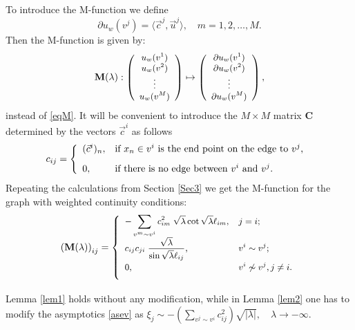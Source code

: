 \documentclass{amsart}
\theoremstyle{definition}
\theoremstyle{remark}
\numberwithin{equation}{section}
\begin{document}
{To introduce the M-function we define
\begin{equation}
\partial u_w (v^j) = \langle \vec{c}^j, \vec{u}^j \rangle, \quad m = 1,2, \dots, M.
\end{equation}
Then the M-function is given by:
\begin{equation}  \label{eqMw}
\small \mathbf M (\lambda):
\left(
\begin{array}{c}
u_w (v^1)  \\
u_w (v^2)  \\
\vdots \\
u_w (v^M) 
\end{array}
\right)  \mapsto \left(
\begin{array}{c}
\partial u_w (v^1) \\
\partial u_w (v^2)  \\
\vdots \\
\partial u_w (v^M) \end{array}
\right) ,
\end{equation}
instead of \eqref{eqM}.  It will be convenient to introduce the $ M \times M $ matrix $ \mathbf C $ determined by the vectors $  \vec{c}^i $
as follows
\begin{equation}
 c_{ij} =
 \left\{
 \begin{array}{ll}
 (\vec{c}^i)_n, & \mbox{if $ x_n \in v^i $ is the end point on the edge to  $ v^j$, } \\[3mm]
 0, & \mbox{if there is no edge between $ v^i $ and $ v^j$}.
 \end{array}
 \right.
\end{equation}
Repeating the calculations from Section \ref{Sec3} we get the M-function for the graph with weighted continuity conditions:
\begin{equation}
\small \left(\mathbf M (\lambda) \right)_{ij} =
\left\{
\begin{array}{ll}
- \displaystyle \sum_{v^m \sim v^i} c_{im}^2 \; \sqrt{\lambda} \cot \sqrt{\lambda} \ell_{im}, & j =i; \\[3mm]
 \displaystyle c_{ij} c_{ji} \; \frac{\sqrt{\lambda}}{\sin \sqrt{\lambda} \ell_{ij}} , & v^i \sim v^j; \\[3mm]
\displaystyle  0, &  v^i \not\sim v^j,j \neq i. \\[3mm]
 \end{array} \right.
\end{equation}

Lemma \ref{lem1} holds without any modification, while in Lemma \ref{lem2} one has to modify the asymptotics \eqref{asev} as
$
 \xi_j \sim - \left(\sum_{v^j \sim v^i} c_{ij}^2\right) \sqrt{|\lambda|}, \quad \lambda \rightarrow - \infty.
$




}
\end{document}
